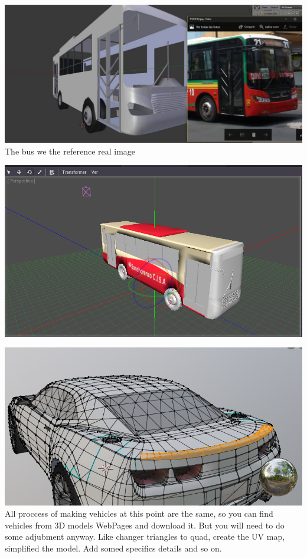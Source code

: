 \documentclass{article}
\begin{document}
  \includegraphics[width=\textwidth]{43.jpg}
  The bus we the reference real image
  
  \includegraphics[width=\textwidth]{44.png}


  \includegraphics[width=\textwidth]{34.png}
  All proccess of making vehicles at this point are the same, so you can find vehicles from 3D models WebPages and download it. But you will need to do some adjubment anyway. Like changer triangles to quad, create the UV map, simplified the model. Add somed specifics details and so on.
\end{document}
